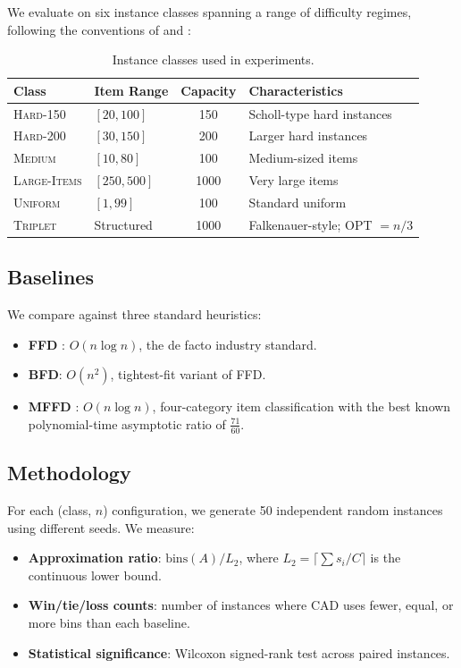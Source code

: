 \documentclass[11pt]{article}
\begin{document}
We evaluate on six instance classes spanning a range of difficulty regimes,
following the conventions of \citet{scholl1997bison} and \citet{falkenauer1996hybrid}:

\begin{table}[h]
\centering
\caption{Instance classes used in experiments.}
\label{tab:instances}
\begin{tabular}{llcl}
\toprule
\textbf{Class} & \textbf{Item Range} & \textbf{Capacity} & \textbf{Characteristics} \\
\midrule
\textsc{Hard-150}    & $[20, 100]$ & 150  & Scholl-type hard instances \\
\textsc{Hard-200}    & $[30, 150]$ & 200  & Larger hard instances \\
\textsc{Medium}      & $[10, 80]$  & 100  & Medium-sized items \\
\textsc{Large-Items} & $[250, 500]$& 1000 & Very large items \\
\textsc{Uniform}     & $[1, 99]$   & 100  & Standard uniform \\
\textsc{Triplet}     & Structured  & 1000 & Falkenauer-style; OPT $= n/3$ \\
\bottomrule
\end{tabular}
\end{table}

\subsection{Baselines}

We compare against three standard heuristics:
\begin{itemize}[nosep]
  \item \textbf{FFD} \citep{dosa2007tight}: $O(n \log n)$, the de facto industry standard.
  \item \textbf{BFD}: $O(n^2)$, tightest-fit variant of FFD.
  \item \textbf{MFFD} \citep{johnson1985bin}: $O(n \log n)$, four-category item classification with the best known polynomial-time asymptotic ratio of $\frac{71}{60}$.
\end{itemize}

\subsection{Methodology}

For each (class, $n$) configuration, we generate 50 independent random instances using
different seeds. We measure:
\begin{itemize}[nosep]
  \item \textbf{Approximation ratio}: $\text{bins}(A) / L_2$, where $L_2 = \lceil \sum s_i / C \rceil$ is the continuous lower bound.
  \item \textbf{Win/tie/loss counts}: number of instances where CAD uses fewer, equal, or more bins than each baseline.
  \item \textbf{Statistical significance}: Wilcoxon signed-rank test across paired instances.
\end{itemize}
\end{document}
